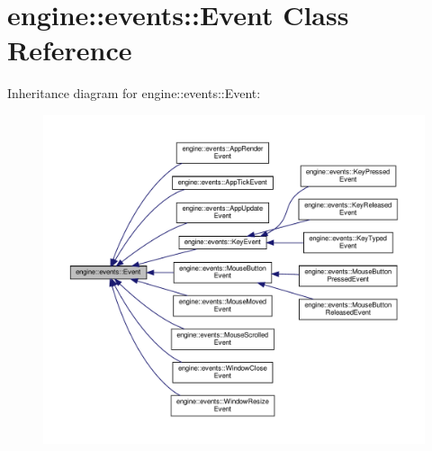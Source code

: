 \hypertarget{classengine_1_1events_1_1Event}{}\section{engine\+:\+:events\+:\+:Event Class Reference}
\label{classengine_1_1events_1_1Event}


Inheritance diagram for engine\+:\+:events\+:\+:Event\+:
\nopagebreak
\begin{figure}[H]
\begin{center}
\leavevmode
\includegraphics[width=350pt]{classengine_1_1events_1_1Event__inherit__graph}
\end{center}
\end{figure}
